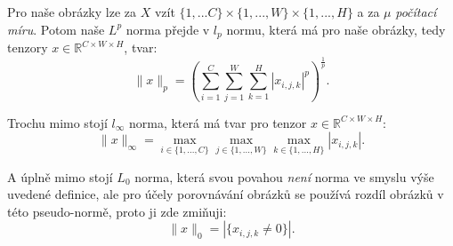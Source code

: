 \documentclass[czech]{article}
\begin{document}
Pro naše obrázky lze za $X$ vzít $\{1, ... C\} \times \{1, ..., W\} \times \{1, ..., H\}$ a za $\mu$ \emph{počítací míru}.
Potom naše $L^p$ norma přejde v $l_p$ normu, která má pro naše obrázky, tedy tenzory $x \in \mathbb{R}^{C \times W \times H}$, tvar:
\begin{equation}
    \|x\|_p = \left( \sum_{i=1}^{C} \sum_{j=1}^{W} \sum_{k=1}^{H} |x_{i, j, k}|^p \right)^{\frac{1}{p}}.
\end{equation}

Trochu mimo stojí $l_{\infty}$ norma, která má tvar pro tenzor $x \in \mathbb{R}^{C \times W \times H}$:
\begin{equation}
    \|x\|_\infty = \max_{i \in \{1, ..., C\}} \max_{j \in \{1, ..., W\}} \max_{k \in \{1, ..., H\}} |x_{i, j, k}|.
\end{equation}

A úplně mimo stojí $L_0$ norma, která svou povahou \emph{není} norma ve smyslu výše uvedené definice,
ale pro účely porovnávání obrázků se používá rozdíl obrázků v této pseudo-normě, proto ji zde zmiňuji:
\begin{equation}
    \|x\|_0 = |\{x_{i, j, k} \neq 0\}|.
\end{equation}
\end{document}
